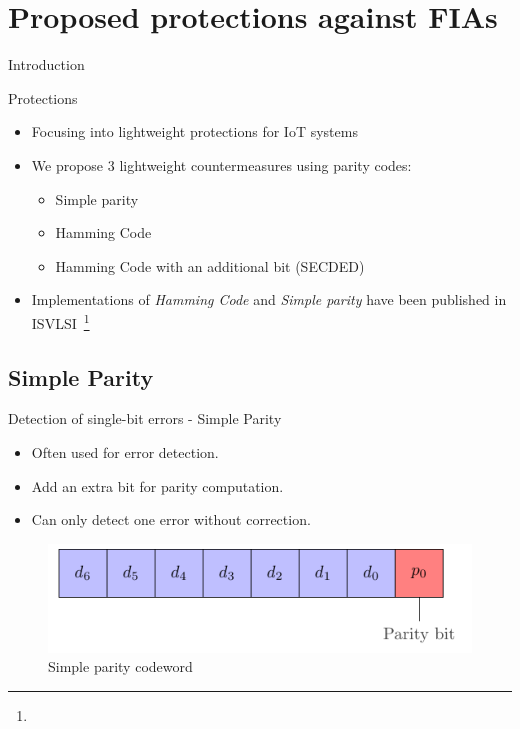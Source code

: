 \section{Proposed protections against FIAs}


\begin{frame}{Introduction}
    \begin{block}{Protections}
        \begin{itemize}
            \item Focusing into lightweight protections for IoT systems
            \item We propose 3 lightweight countermeasures using parity codes:
            \begin{itemize}
                \item Simple parity
                \item Hamming Code
                \item Hamming Code with an additional bit (SECDED)
            \end{itemize}
            \item Implementations of \textit{Hamming Code} and \textit{Simple parity} have been published in ISVLSI~\footnote[frame]{\scriptsize{}}
        \end{itemize}
    \end{block}
\end{frame}
\subsection{Simple Parity}
    \begin{frame}{Detection of single-bit errors - Simple Parity}
        \begin{block}{}
            \begin{itemize}
                \justifying
                \item Often used for error detection.
                \item Add an extra bit for parity computation.
                \item Can only detect one error without correction.
            \end{itemize}
        \end{block}

        \vfill
        
        \begin{figure}
            \centering
            \includegraphics[width=.5\textwidth, page=1]{src/4_strategies/img/simple_parity.pdf}
            \caption{Simple parity codeword}
            \label{fig:simple_parity_codeword}
        \end{figure}
    \end{frame}

